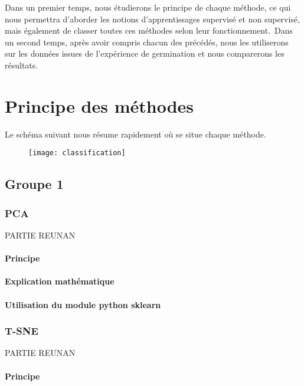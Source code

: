 \documentclass[12pt]{report}
\begin{document}
Dans un premier temps, nous étudierons le principe de chaque méthode, ce qui nous permettra d'aborder les notions d'apprentissages supervisé et non supervisé, mais également de classer toutes ces méthodes selon leur fonctionnement.\
Dans un second temps, après avoir compris chacun des précédés, nous les utiliserons sur les données issues de l'expérience de germination et nous comparerons les résultats.


\chapter{Principe des méthodes}

\noindent Le schéma suivant nous résume rapidement où se situe chaque méthode. 

\begin{figure}[H] 
\centerline{\texttt{[image: classification]}}
\end{figure}


\section{Groupe 1}

\subsection{PCA}

PARTIE REUNAN

\subsubsection{Principe}

\subsubsection{Explication mathématique}

\subsubsection{Utilisation du module python sklearn}

\subsection{T-SNE}

PARTIE REUNAN

\subsubsection{Principe}
\end{document}
